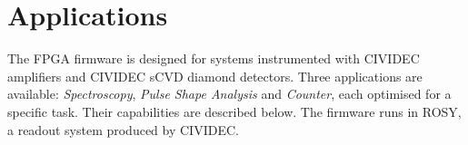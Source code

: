 

\section{Applications}
\label{sec:applications}

The FPGA firmware is designed for systems instrumented with CIVIDEC amplifiers and CIVIDEC sCVD diamond detectors. Three applications are available: \emph{Spectroscopy}, \emph{Pulse Shape Analysis} and \emph{Counter}, each optimised for a specific task. Their capabilities are described below. The firmware runs in ROSY, a readout system produced by CIVIDEC.

